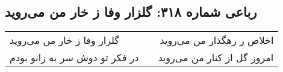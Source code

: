 \begin{center}
\section*{رباعی شماره ۳۱۸: گلزار وفا ز خار من می‌روید}
\label{sec:sh318}
\begin{longtable}{l p{0.5cm} r}
گلزار وفا ز خار من می‌روید
&&
اخلاص ز رهگذار من می‌روید
\\
در فکر تو دوش سر به زانو بودم
&&
امروز گل از کنار من می‌روید
\\
\end{longtable}
\end{center}
